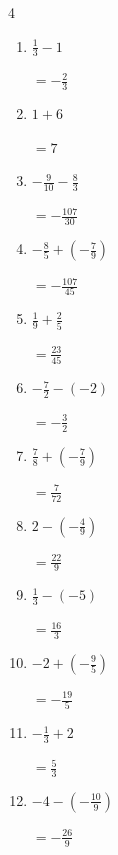 \begin{multicols}{4}
\begin{enumerate}
        $\displaystyle =\frac{49}{30}$

  \item $\displaystyle \frac{1}{3} - 1$

        $\displaystyle =-\frac{2}{3}$

  \item $\displaystyle 1 + 6$

        $\displaystyle =7$

  \item $\displaystyle -\frac{9}{10} - \frac{8}{3}$

        $\displaystyle =-\frac{107}{30}$

  \item $\displaystyle -\frac{8}{5} + \left(-\frac{7}{9}\right)$

        $\displaystyle =-\frac{107}{45}$

  \item $\displaystyle \frac{1}{9} + \frac{2}{5}$

        $\displaystyle =\frac{23}{45}$

  \item $\displaystyle -\frac{7}{2} - \left(-2\right)$

        $\displaystyle =-\frac{3}{2}$

  \item $\displaystyle \frac{7}{8} + \left(-\frac{7}{9}\right)$

        $\displaystyle =\frac{7}{72}$

  \item $\displaystyle 2 - \left(-\frac{4}{9}\right)$

        $\displaystyle =\frac{22}{9}$

\columnbreak %

  \item $\displaystyle \frac{1}{3} - \left(-5\right)$

        $\displaystyle =\frac{16}{3}$

  \item $\displaystyle -2 + \left(-\frac{9}{5}\right)$

        $\displaystyle =-\frac{19}{5}$

  \item $\displaystyle -\frac{1}{3} + 2$

        $\displaystyle =\frac{5}{3}$

  \item $\displaystyle -4 - \left(-\frac{10}{9}\right)$

        $\displaystyle =-\frac{26}{9}$


\end{enumerate}
\end{multicols}
